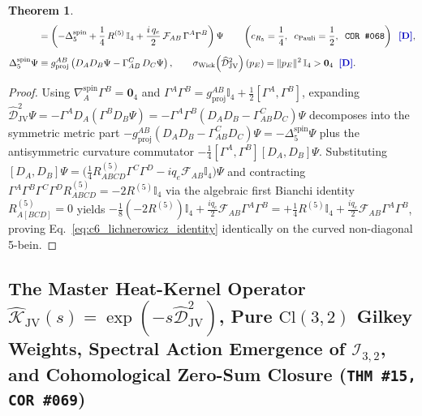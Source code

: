 \documentclass[11pt,a4paper]{article}
\newcommand{\catD}{\text{\textbf{\textcolor{blue!75!black}{[D]}}}}
\theoremstyle{definition}
\theoremstyle{plain}
\newtheorem{theorem}[axiom]{Theorem}
\theoremstyle{remark}
\begin{document}
\begin{theorem}
\begin{align}
&= \left(-\Delta_5^{\mathrm{spin}} + \frac{1}{4}\,R^{(5)}\,\mathbb{I}_4 + \frac{i\,q_e}{2}\,\mathcal{F}_{AB}\,\Gamma^A\Gamma^B\right)\Psi \qquad \left(c_{R_5} = \frac{1}{4}, \;\; c_{\mathrm{Pauli}} = \frac{1}{2}, \;\; \textnormal{\texttt{COR~\#068}}\right) \;\;\catD, \nonumber \\[4pt]
\Delta_5^{\mathrm{spin}}\Psi &\equiv g^{AB}_{\mathrm{proj}}\left(D_A D_B\Psi - \Gamma^C_{AB}\,D_C\Psi\right), \qquad
\sigma_{\mathrm{Wick}}\!\left(\widehat{\mathcal{D}}_{\mathrm{JV}}^2\right)(p_E) = \|p_E\|^2\,\mathbb{I}_4 > \mathbf{0}_4 \;\;\catD. \label{eq:c6_lichnerowicz_identity}
\end{align}
\end{theorem}

\begin{proof}
Using $\nabla_A^{\mathrm{spin}}\Gamma^B = \mathbf{0}_4$ and $\Gamma^A\Gamma^B = g^{AB}_{\mathrm{proj}}\mathbb{I}_4 + \frac{1}{2}[\Gamma^A, \Gamma^B]$, expanding $\widehat{\mathcal{D}}_{\mathrm{JV}}^2\Psi = -\Gamma^A D_A(\Gamma^B D_B\Psi) = -\Gamma^A\Gamma^B(D_A D_B - \Gamma^C_{AB}D_C)\Psi$ decomposes into the symmetric metric part $-g^{AB}_{\mathrm{proj}}(D_A D_B - \Gamma^C_{AB}D_C)\Psi = -\Delta_5^{\mathrm{spin}}\Psi$ plus the antisymmetric curvature commutator $-\frac{1}{4}[\Gamma^A, \Gamma^B][D_A, D_B]\Psi$. Substituting $[D_A, D_B]\Psi = \big(\frac{1}{4}R_{ABCD}^{(5)}\Gamma^C\Gamma^D - i q_e\mathcal{F}_{AB}\mathbb{I}_4\big)\Psi$ and contracting $\Gamma^A\Gamma^B\Gamma^C\Gamma^D R_{ABCD}^{(5)} = -2 R^{(5)}\mathbb{I}_4$ via the algebraic first Bianchi identity $R_{A[BCD]}^{(5)} = 0$ yields $-\frac{1}{8}(-2 R^{(5)})\mathbb{I}_4 + \frac{i q_e}{2}\mathcal{F}_{AB}\Gamma^A\Gamma^B = +\frac{1}{4}R^{(5)}\mathbb{I}_4 + \frac{i q_e}{2}\mathcal{F}_{AB}\Gamma^A\Gamma^B$, proving Eq.~\eqref{eq:c6_lichnerowicz_identity} identically on the curved non-diagonal 5-bein.
\end{proof}

\subsection{The Master Heat-Kernel Operator $\widehat{\mathcal{K}}_{\mathrm{JV}}(s) = \exp(-s\widehat{\mathcal{D}}_{\mathrm{JV}}^2)$, Pure $\mathrm{Cl}(3,2)$ Gilkey Weights, Spectral Action Emergence of $\mathcal{I}_{3,2}$, and Cohomological Zero-Sum Closure (\texttt{THM~\#15, COR~\#069})}
\end{document}
